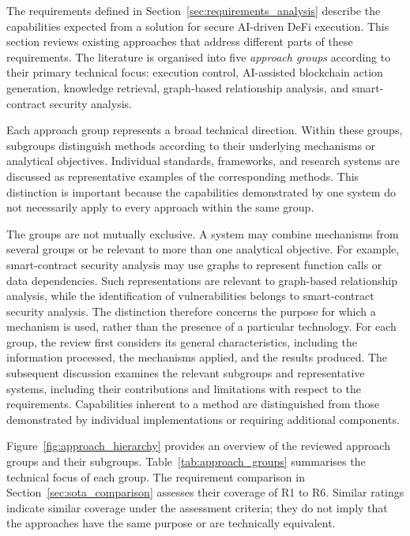 

The requirements defined in Section~\ref{sec:requirements_analysis}
describe the capabilities expected from a solution for secure
AI-driven DeFi execution. This section reviews existing approaches
that address different parts of these requirements. The literature
is organised into five \textit{approach groups} according to their
primary technical focus: execution control, AI-assisted blockchain
action generation, knowledge retrieval, graph-based relationship
analysis, and smart-contract security analysis.

Each approach group represents a broad technical direction. Within
these groups, subgroups distinguish methods according to their
underlying mechanisms or analytical objectives. Individual
standards, frameworks, and research systems are discussed as
representative examples of the corresponding methods. This
distinction is important because the capabilities demonstrated by
one system do not necessarily apply to every approach within
the same group.

The groups are not mutually exclusive. A system may combine
mechanisms from several groups or be relevant to more than
one analytical objective. For example, smart-contract security
analysis may use graphs to represent function calls or data
dependencies. Such representations are relevant to graph-based
relationship analysis, while the identification of vulnerabilities
belongs to smart-contract security analysis. The distinction
therefore concerns the purpose for which a mechanism is used,
rather than the presence of a particular technology. For each group, the review first considers its general
characteristics, including the information processed, the
mechanisms applied, and the results produced. The subsequent
discussion examines the relevant subgroups and representative
systems, including their contributions and limitations with
respect to the requirements. Capabilities inherent to a method
are distinguished from those demonstrated by individual
implementations or requiring additional components.

Figure~\ref{fig:approach_hierarchy} provides an overview of
the reviewed approach groups and their subgroups.
Table~\ref{tab:approach_groups} summarises the technical focus
of each group. The requirement
comparison in Section~\ref{sec:sota_comparison} assesses their
coverage of R1 to R6. Similar ratings indicate similar coverage
under the assessment criteria; they do not imply that the
approaches have the same purpose or are technically equivalent.



